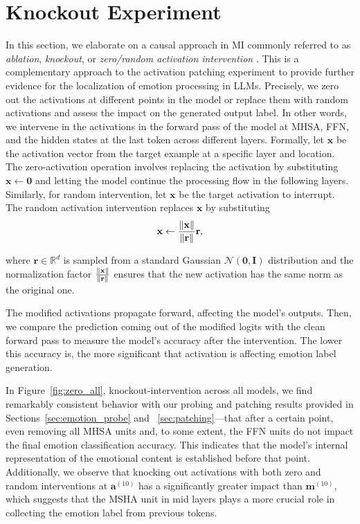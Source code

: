 \section{Knockout Experiment} \label{app:zero}
In this section, we elaborate on a causal approach in MI commonly referred to as \textit{ablation}, \textit{knockout}, or \textit{zero/random activation intervention} \cite{rai2024practical, olsson2022context, wang2022interpretability,chen2023sudden}. This is a complementary approach to the activation patching experiment to provide further evidence for the localization of emotion processing in LLMs. Precisely, we zero out the activations at different points in the model or replace them with random activations and assess the impact on the generated output label. In other words, we intervene in the activations in the forward pass of the model at MHSA, FFN, and the hidden states at the last token across different layers.
Formally, let \( \mathbf{x}\) be the activation vector from the target example at a specific layer and location. The zero-activation operation involves replacing the activation by substituting \(\mathbf{x} \leftarrow \mathbf{0}\) and letting the model continue the processing flow in the following layers. Similarly, for random intervention, let \( \mathbf{x} \) be the target activation to interrupt. The random activation intervention replaces \( \mathbf{x} \) by substituting
\[
\mathbf{x} \leftarrow \frac{\lVert\mathbf{x}\rVert}{\lVert\mathbf{r}\rVert}\mathbf{r},
\]

where \( \mathbf{r} \in \mathbb{R}^d \) is sampled from a standard Gaussian $\mathcal{N}(\mathbf{0}, \mathbf{I})$ distribution and the normalization factor $\frac{\lVert\mathbf{x}\rVert}{\lVert\mathbf{r}\rVert}$ ensures that the new activation has the same norm as the original one.

The modified activations propagate forward, affecting the model's outputs. Then, we compare the prediction coming out of the modified logits with the clean forward pass to measure the model's accuracy after the intervention. The lower this accuracy is, the more significant that activation is affecting emotion label generation.


In Figure~\ref{fig:zero_all}, knockout-intervention across all models, we find remarkably consistent behavior with our probing and patching results provided in Sections~\ref{sec:emotion_probe} and ~\ref{sec:patching}—that after a certain point, even removing all MHSA units and, to some extent, the FFN units do not impact the final emotion classification accuracy. This indicates that the model's internal representation of the emotional content is established before that point. Additionally, we observe that knocking out activations with both zero and random interventions at \( \mathbf{a}^{(10)} \) has a significantly greater impact than \(\mathbf{m}^{(10)} \), which suggests that the MSHA unit in mid layers plays a more crucial role in collecting the emotion label from previous tokens.

